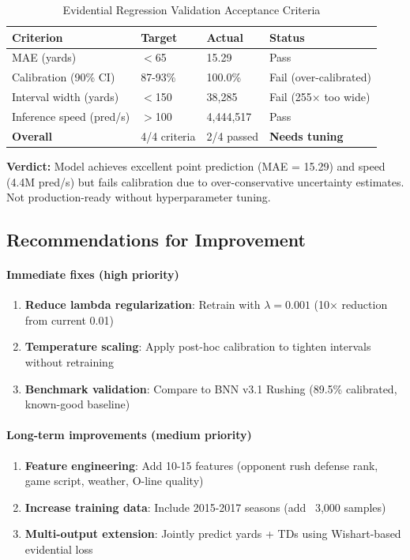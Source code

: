 \begin{table}[h]
\centering
\caption{Evidential Regression Validation Acceptance Criteria}
\label{tab:evidential_acceptance_criteria}
\begin{tabular}{llll}
\toprule
\textbf{Criterion} & \textbf{Target} & \textbf{Actual} & \textbf{Status} \\
\midrule
MAE (yards) & $<$65 & 15.29 & Pass \\
Calibration (90\% CI) & 87-93\% & 100.0\% & Fail (over-calibrated) \\
Interval width (yards) & $<$150 & 38,285 & Fail (255$\times$ too wide) \\
Inference speed (pred/s) & $>$100 & 4,444,517 & Pass \\
\midrule
\textbf{Overall} & 4/4 criteria & 2/4 passed & \textbf{Needs tuning} \\
\bottomrule
\end{tabular}
\end{table}

\noindent \textbf{Verdict:} Model achieves excellent point prediction (MAE = 15.29) and speed (4.4M pred/s) but fails calibration due to over-conservative uncertainty estimates. Not production-ready without hyperparameter tuning.

\subsection{Recommendations for Improvement}

\paragraph{Immediate fixes (high priority)}
\begin{enumerate}[nosep]
    \item \textbf{Reduce lambda regularization}: Retrain with $\lambda=0.001$ (10× reduction from current 0.01)
    \item \textbf{Temperature scaling}: Apply post-hoc calibration to tighten intervals without retraining
    \item \textbf{Benchmark validation}: Compare to BNN v3.1 Rushing (89.5\% calibrated, known-good baseline)
\end{enumerate}

\paragraph{Long-term improvements (medium priority)}
\begin{enumerate}[nosep]
    \item \textbf{Feature engineering}: Add 10-15 features (opponent rush defense rank, game script, weather, O-line quality)
    \item \textbf{Increase training data}: Include 2015-2017 seasons (add ~3,000 samples)
    \item \textbf{Multi-output extension}: Jointly predict yards + TDs using Wishart-based evidential loss
\end{enumerate}

